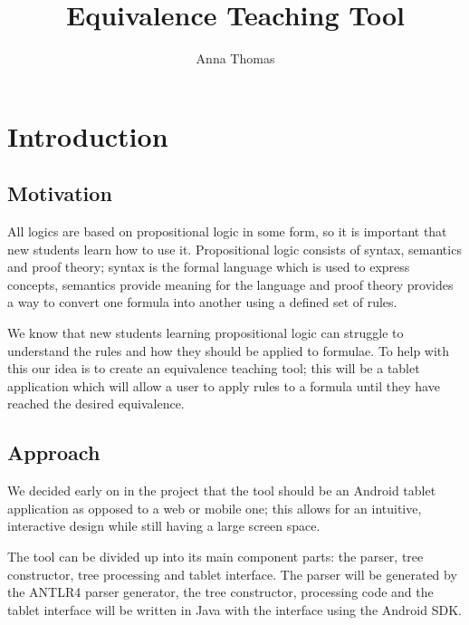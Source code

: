 \documentclass{report}
\begin{document}
\expandafter\def\csname PY@tok@err\endcsname{}

\title{Equivalence Teaching Tool}
\author{Anna Thomas}

\maketitle

\tableofcontents

\chapter{Introduction}

\section{Motivation}

All logics are based on propositional logic in some form, so it is important that new students learn how to use it. Propositional logic consists of syntax, semantics and proof theory; syntax is the formal language which is used to express concepts, semantics provide meaning for the language and proof theory provides a way to convert one formula into another using a defined set of rules.

We know that new students learning propositional logic can struggle to understand the rules and how they should be applied to formulae. To help with this our idea is to create an equivalence teaching tool; this will be a tablet application which will allow a user to apply rules to a formula until they have reached the desired equivalence.

\section{Approach}

We decided early on in the project that the tool should be an Android tablet application as opposed to a web or mobile one; this allows for an intuitive, interactive design while still having a large screen space.

The tool can be divided up into its main component parts: the parser, tree constructor, tree processing and tablet interface. The parser will be generated by the ANTLR4 parser generator, the tree constructor, processing code and the tablet interface will be written in Java with the interface using the Android SDK.
\end{document}
